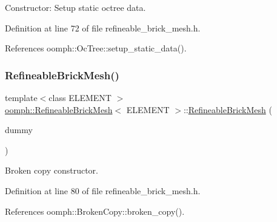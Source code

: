 Constructor\+: Setup static octree data. 



Definition at line 72 of file refineable\+\_\+brick\+\_\+mesh.\+h.



References oomph\+::\+Oc\+Tree\+::setup\+\_\+static\+\_\+data().

\mbox{\label{classoomph_1_1RefineableBrickMesh_add68645a4655055660c49388d345c421}} 
\subsubsection{\texorpdfstring{Refineable\+Brick\+Mesh()}{RefineableBrickMesh()}\hspace{0.1cm}{\footnotesize\ttfamily [2/2]}}
{\footnotesize\ttfamily template$<$class E\+L\+E\+M\+E\+NT $>$ \\
\hyperlink{classoomph_1_1RefineableBrickMesh}{oomph\+::\+Refineable\+Brick\+Mesh}$<$ E\+L\+E\+M\+E\+NT $>$\+::\hyperlink{classoomph_1_1RefineableBrickMesh}{Refineable\+Brick\+Mesh} (\begin{DoxyParamCaption}\item[{const \hyperlink{classoomph_1_1RefineableBrickMesh}{Refineable\+Brick\+Mesh}$<$ E\+L\+E\+M\+E\+NT $>$ \&}]{dummy }\end{DoxyParamCaption})\hspace{0.3cm}{\ttfamily [inline]}}



Broken copy constructor. 



Definition at line 80 of file refineable\+\_\+brick\+\_\+mesh.\+h.



References oomph\+::\+Broken\+Copy\+::broken\+\_\+copy().

\mbox{\label{classoomph_1_1RefineableBrickMesh_a179600dd1c82fb9f3753f59d9cc262f6}} 
